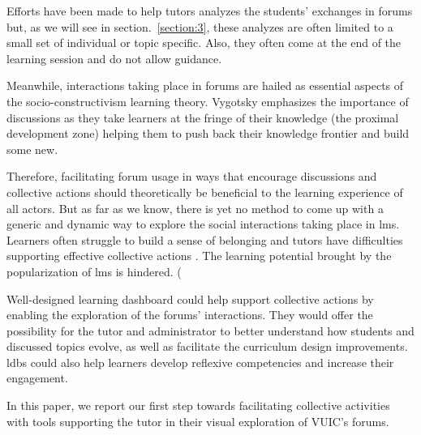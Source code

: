 \documentclass[a4paper,twoside]{article}
\begin{document}
Efforts have been made to help tutors analyzes the students' exchanges in forums but, as we will see in section.~\ref{section:3}, these analyzes are often limited to a small set of individual or topic specific.  Also, they often come at the end of the learning session and do not allow guidance.

Meanwhile, interactions taking place in forums are hailed as essential aspects of the socio-constructivism learning theory.  Vygotsky emphasizes the importance of discussions as they take learners at the fringe of their knowledge (the proximal development zone) helping them to push back their knowledge frontier and build some new.

Therefore, facilitating forum usage in ways that encourage discussions and collective actions should theoretically be beneficial to the learning experience of all actors.  But as far as we know, there is yet no method to come up with a generic and dynamic way to explore the social interactions taking place in \gls{lms}.  Learners often struggle to build a sense of belonging \citep{Khalil2014} and tutors have difficulties supporting effective collective actions \citep{Zheng2015}.  The learning potential brought by the popularization of \gls{lms} is hindered.
(%


Well-designed learning dashboard could help support collective actions by enabling the exploration of the forums' interactions.  They would offer the possibility for the tutor and administrator to better understand how students and discussed topics evolve, as well as facilitate the curriculum design improvements.  \glspl{ldb} could also help learners develop reflexive competencies and increase their engagement.


In this paper, we report our first step towards facilitating collective activities with tools supporting the tutor in their visual exploration of VUIC's forums.

\end{document}
